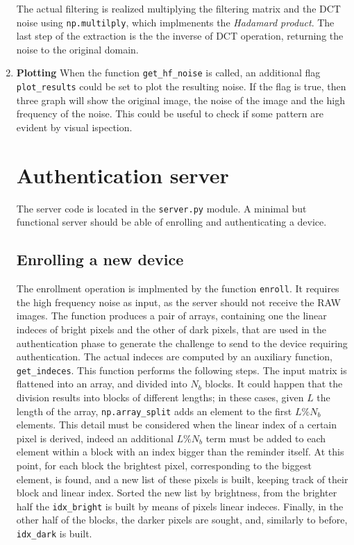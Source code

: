 \begin{enumerate}
        The actual filtering is realized multiplying the filtering matrix and the DCT noise using \texttt{np.multilply}, which implmenents the \emph{Hadamard product}. The last step of the extraction is the the inverse of DCT operation, returning the noise to the original domain.
  \item \textbf{Plotting}
        When the function \texttt{get\_hf\_noise} is called, an additional flag \texttt{plot\_results} could be set to plot the resulting noise. If the flag is true, then three graph will show the original image, the noise of the image and the high frequency of the noise. This could be useful to check if some pattern are evident by visual ispection.

        \section{Authentication server}\label{sec:authserver}
        The server code is located in the \texttt{server.py} module. A minimal but functional server should be able of enrolling and authenticating a device.

        \subsection{Enrolling a new device}\label{subsec:enrollment}
        The enrollment operation is implmented by the function \texttt{enroll}. It requires the high frequency noise as input, as the server should not receive the RAW images. The function produces a pair of arrays, containing one the linear indeces of bright pixels and the other of dark pixels, that are used in the authentication phase to generate the challenge to send to the device requiring authentication.
        The actual indeces are computed by an auxiliary function, \texttt{get\_indeces}. This function performs the following steps. The input matrix is flattened into an array, and divided into $N_{b}$ blocks.
        It could happen that the division results into blocks of different lengths; in these cases, given $L$ the length of the array, \texttt{np.array\_split} adds an element to the first $L \% N_{b}$ elements. This detail must be considered when the linear index of a certain pixel is derived, indeed an additional $L \% N_{b}$ term must be added to each element within a block with an index bigger than the reminder itself.
        At this point, for each block the brightest pixel, corresponding to the biggest element, is found, and a new list of these pixels is built, keeping track of their block and linear index.
        Sorted the new list by brightness, from the brighter half the \texttt{idx\_bright}
        is built by means of pixels linear indeces. Finally, in the other half of the blocks, the darker pixels are sought, and, similarly to before, \texttt{idx\_dark} is built.


\end{enumerate}
